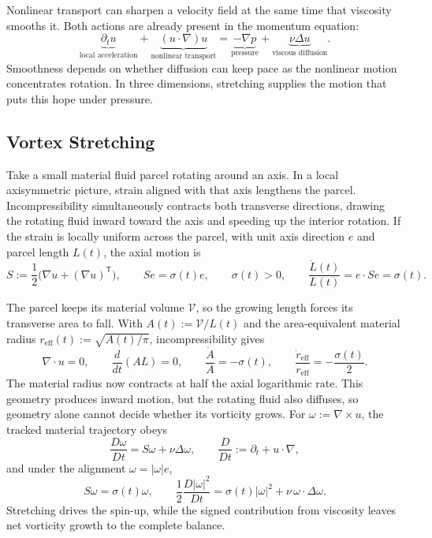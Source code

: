 
Nonlinear transport can sharpen a velocity field at the same time that viscosity smooths it. Both actions are already present in the momentum equation:
\[
  \underbrace{\partial_t u}_{\text{local acceleration}}
  +
  \underbrace{(u\cdot\nabla)u}_{\text{nonlinear transport}}
  =
  \underbrace{-\nabla p}_{\text{pressure}}
  +
  \underbrace{\nu\Delta u}_{\text{viscous diffusion}}.
\]
Smoothness depends on whether diffusion can keep pace as the nonlinear motion concentrates rotation. In three dimensions, stretching supplies the motion that puts this hope under pressure.

\subsection{Vortex Stretching}\label{sub:ThePerfectlyStretchingVortex}

Take a small material fluid parcel rotating around an axis. In a local axisymmetric picture, strain aligned with that axis lengthens the parcel. Incompressibility simultaneously contracts both transverse directions, drawing the rotating fluid inward toward the axis and speeding up the interior rotation. If the strain is locally uniform across the parcel, with unit axis direction \(e\) and parcel length \(L(t)\), the axial motion is
\[
  S:=\frac12\bigl(\nabla u+(\nabla u)^{\mathsf T}\bigr),
  \qquad
  Se=\sigma(t)e,
  \qquad
  \sigma(t)>0,
  \qquad
  \frac{\dot L(t)}{L(t)}
  =
  e\cdot Se
  =
  \sigma(t).
\]

The parcel keeps its material volume \(\mathcal V\), so the growing length forces its transverse area to fall. With \(A(t):=\mathcal V/L(t)\) and the area-equivalent material radius \(r_{\mathrm{eff}}(t):=\sqrt{A(t)/\pi}\), incompressibility gives
\[
  \nabla\cdot u=0,
  \qquad
  \frac{d}{dt}(A L)=0,
  \qquad
  \frac{\dot A}{A}=-\sigma(t),
  \qquad
  \frac{\dot r_{\mathrm{eff}}}{r_{\mathrm{eff}}}
  =
  -\frac{\sigma(t)}{2}.
\]
The material radius now contracts at half the axial logarithmic rate. This geometry produces inward motion, but the rotating fluid also diffuses, so geometry alone cannot decide whether its vorticity grows. For \(\omega:=\nabla\times u\), the tracked material trajectory obeys
\[
  \frac{D\omega}{Dt}
  =
  S\omega+\nu\Delta\omega,
  \qquad
  \frac{D}{Dt}
  :=
  \partial_t+u\cdot\nabla,
\]
and under the alignment \(\omega=|\omega|e\),
\[
  S\omega
  =
  \sigma(t)\omega,
  \qquad
  \frac12\frac{D|\omega|^2}{Dt}
  =
  \sigma(t)|\omega|^2
  +
  \nu\,\omega\cdot\Delta\omega.
\]
Stretching drives the spin-up, while the signed contribution from viscosity leaves net vorticity growth to the complete balance.

